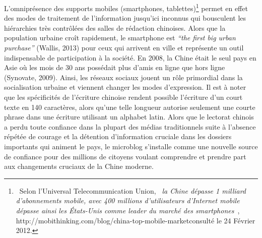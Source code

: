 {\color{black}
L'omnipr\'esence des supports mobiles (smartphones, tablettes)\footnote{\ Selon l'Universal Telecommunication Union,
\textit{{\guillemotleft}~la Chine d\'epasse 1 milliard d'abonnements mobile, avec 400 millions d'utilisateurs
d'Internet mobile d\'epasse ainsi les \'Etats-Unis comme leader du march\'e des smartphones~{\guillemotright}},
http://mobithinking.com/blog/china-top-mobile-market\textstyleInternetlink{ }consult\'e le 24 F\'evrier 2012.} permet
en effet des modes de traitement de l'information jusqu'ici inconnus qui bousculent les hi\'erarchies tr\`es
contr\^ol\'ees des salles de r\'edaction chinoises. Alors que la population urbaine cro\^it rapidement, le smartphone
est \textit{{}``}\textit{the first big urban purchase}\textit{{}''}\textit{ }(Wallis, 2013) pour ceux qui arrivent en
ville et repr\'esente un outil indispensable de participation \`a la soci\'et\'e. En 2008, la Chine \'etait le seul
pays en Asie o\`u les mois de 30 ans poss\'edait plus d'amis en ligne que hors ligne (Synovate, 2009). Ainsi, les
r\'eseaux sociaux jouent un r\^ole primordial dans la socialisation urbaine et viennent changer les modes d'expression.
Il est \`a noter que les sp\'ecificit\'es de l'\'ecriture chinoise rendent possible l'\'ecriture d'un court texte en
140 caract\`eres, alors qu'une telle longueur autorise seulement une courte phrase dans une \'ecriture utilisant un
alphabet latin. Alors que le lectorat chinois a perdu toute confiance dans la plupart des m\'edias traditionnels suite
\`a l'absence r\'ep\'et\'ee de courage et la d\'etention d'information cruciale dans les dossiers importants qui
animent le pays, le microblog s'installe comme une nouvelle source de confiance pour des millions de citoyens voulant
comprendre et prendre part aux changements cruciaux de la Chine moderne.}


\bigskip

